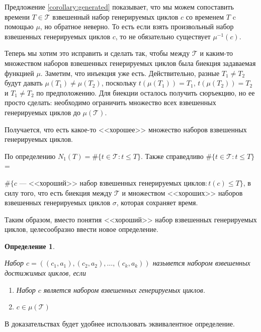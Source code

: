 \documentclass{article}
\makeatletter
\let\@msm@th@eqref\eqref
\renewcommand{\eqref}[1]{%
  \begingroup
  \leavevmode
  \color{violet}%
  \hypersetup{linkbordercolor=[named]{violet}}%
  \@msm@th@eqref{#1}%
  \endgroup
}
\newtheorem{definition}{Определение}
\makeatother
\begin{document}
Предложение \eqref{corollary:generated} показывает, что мы можем сопоставить времени $T \in \mathcal{T}$ взвешенный набор генерируемых циклов $c$ со временем $T$ c помощью $\mu$, но обратное неверно. То есть если взять произвольный набор взвешенных генерируемых циклов $c$, то не обязательно существует $\mu^{-1}(c)$. 

Теперь мы хотим это исправить и сделать так, чтобы между $\mathcal{T}$ и каким-то множеством наборов взвешенных генерируемых циклов была биекция задаваемая функцией $\mu$. Заметим, что инъекция уже есть. Действительно, разные $T_{1} \neq T_{2}$ будут давать $\mu(T_{1}) \neq \mu(T_{2})$, поскольку 
$t(\mu(T_{1})) = T_{1}$, $t(\mu(T_{2})) = T_{2}$ и $T_{1} \neq T_{2}$ по предположению.  Для биекции осталось получить сюръекцию, но ее просто сделать: необходимо ограничить множество всех взвешенных генерируемых циклов до $\mu(\mathcal{T})$.

Получается, что есть какое-то <<хорошее>> множество наборов взвешенных генерируемых циклов. 

По определению $N_{1}(T) = \#\{t \in \mathcal{T}: t \leq T\}$. 
Также справедливо
$\#\{t \in \mathcal{T}: t \leq T\}$ = 

\noindent
$\#\{c \text{ --- <<хороший>> набор взвешенных генерируемых циклов}: t(c) \leq T\}$, в силу того, что есть биекция между $\mathcal{T}$ и множеством <<хороших>> наборов взвешенных генерируемых циклов $\sigma$, которая сохраняет
время.

Таким образом, вместо понятия <<хороший>> набор взвешенных генерируемых циклов, целесообразно ввести новое определение.

\begin{definition} $ $
    \label{def:reachable_weighted_simple}
    
    Набор $c = ((c_{1}, a_{1}), (c_{2}, a_{2}), \ldots, (c_{k}, a_{k}))$ назывется набором взвешенных достижимых циклов, если
    \begin{enumerate}
         \item Набор $c$ является набором взвешенных генерируемых циклов.
         \item $c \in \mu(\mathcal{T})$  
    \end{enumerate}
\end{definition}

В доказательствах будет удобнее использовать эквивалентное определение.
\end{document}
